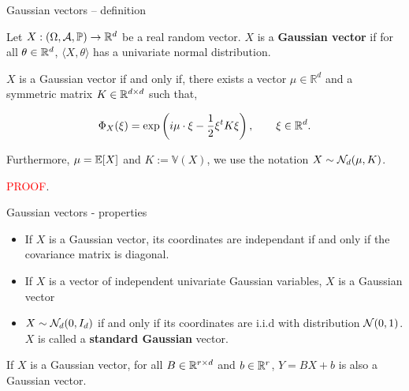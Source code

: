 \documentclass{beamer}
\begin{document}
  \begin{frame}{Gaussian vectors -- definition}
    \begin{definition}
      Let $X:(\Omega,\mathcal{A},\mathbb{P}) \to \mathbb{R}^{d}$ be a real random vector. $X$ is a \textbf{Gaussian
        vector} if for all $\theta \in \mathbb{R}^{d}$, $\langle X, \theta \rangle$ has a
      univariate normal distribution.
    \end{definition}

    \pause

    \begin{theorem} $X$ is a Gaussian vector if and only if, there exists a
      vector $\mu \in \mathbb{R}^{d}$ and a symmetric matrix $K \in \mathbb{R}^{d \times d}$ such that, 
      
      \begin{equation}
        \Phi_{X}(\xi)=\exp \left(i \mu \cdot \xi-\frac{1}{2} \xi^t K \xi\right),
        \qquad \xi \in \mathbb{R}^{d}.
      \end{equation}
      
      Furthermore, $\mu = \mathbb{E}[X]$ and $K := \mathbb{V}(X)$, we use the notation
      $X \sim \mathcal{N}_d(\mu,K)$.
    \end{theorem}

    \textcolor{red}{PROOF}. 
  \end{frame}

  \begin{frame}{Gaussian vectors - properties}

    \begin{corollary}
      \begin{itemize}
      \item If $X$ is a Gaussian vector, its coordinates are independant if and only if
        the covariance matrix is diagonal.

        \pause
        
      \item If $X$ is a vector of independent univariate
        Gaussian variables, $X$ is a Gaussian vector

        \pause
        
      \item  $X \sim \mathcal{N}_d(0,I_d)$ if and only if its coordinates are i.i.d with
        distribution $\mathcal{N}(0,1)$. $X$ is called a \textbf{standard Gaussian}
        vector.

      \end{itemize}
    \end{corollary}

    \pause

    \begin{prop}
      If $X$ is a Gaussian vector, for all $B \in \mathbb{R}^{r \times d}$ and $b
      \in \mathbb{R}^r$, $Y = BX + b$ is also a Gaussian vector.
    \end{prop}
    
  \end{frame}
\end{document}

